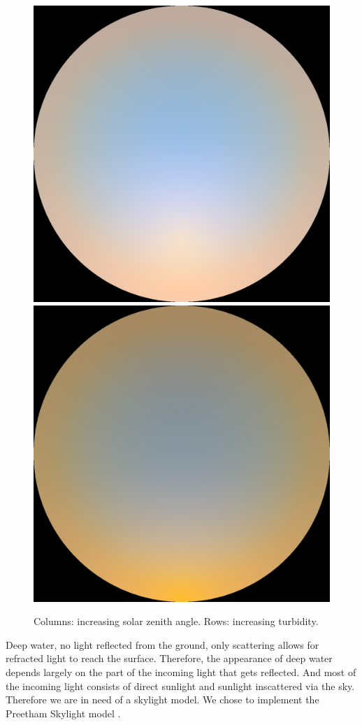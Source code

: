\begin{figure}
{ }
 \hfill
 \subtop
 {
 \includegraphics[scale=0.125]{figures/preetham_sRGB_D65_turbidity_6_thetaSun_60.png}
 }
 \hfill
 \subtop
 {
 \includegraphics[scale=0.125]{figures/preetham_sRGB_D65_turbidity_6_thetaSun_90.png}
 }
\caption{Columns: increasing solar zenith angle. Rows: increasing turbidity.}
\label{fig:preetham}
\end{figure}
%
Deep water, no light reflected from the ground, only scattering allows for refracted light to reach the surface. Therefore, the appearance of deep water depends largely on the part of the
incoming light that gets reflected. And most of the incoming light consists of
direct sunlight and sunlight inscattered via the sky. Therefore we are in need
of a skylight model. We chose to implement the Preetham Skylight model
\cite{Preetham:1999}.
